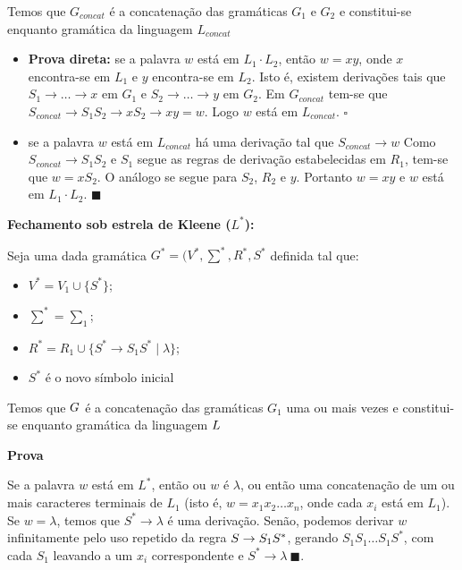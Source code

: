\documentclass[12pt]{article}
\begin{document}
\begin{enumerate}
	      Temos que $G_{concat}$ é a concatenação das gramáticas $G_1$ e $G_2$ e
	      constitui-se enquanto gramática da linguagem $L_{concat}$
	      
	      \begin{itemize}
		      \item \textbf{Prova direta:} se a palavra $w$ está em $L_1 \cdot
			            L_2$, então $w = x y$, onde $x$ encontra-se em $L_1$ e $y$
		            encontra-se em $L_2$. Isto é, existem derivações tais que $S_1
			            \rightarrow \dots \rightarrow x$ em $G_1$ e $S_2
			            \rightarrow \dots \rightarrow y$ em $G_2$. Em $G_{concat}$
		            tem-se que $S_{concat} \rightarrow S_1S_2 \rightarrow xS_2
			            \rightarrow xy = w$. Logo $w$ está em
		            $L_{concat}$. $\square$
		            
		      \item {} se a palavra $w$ está em
		            $L_{concat}$ há uma derivação tal que $S_{concat}
			            \rightarrow w$ Como $S_{concat} \rightarrow S_1S_2$ e
		            $S_1$ segue as regras de derivação estabelecidas em
		            $R_1$, tem-se que $w = xS_2$. O análogo se segue para
		            $S_2$, $R_2$ e $y$. Portanto $w = x y$ e $w$ está em
		            $L_1 \cdot L_2$. $\blacksquare$
	      \end{itemize}
	      
	      \textbf{Fechamento sob estrela de Kleene ($L^*$):}
	      
	      Seja uma dada gramática $G^* = (V^*, \sum^*, R^*, S^*$ definida tal
	      que:
	      
	      \begin{itemize}
		      \item $V^* = V_1 \cup \{S^*\}$;
		      \item $\sum^* = \sum_1$;
		      \item $R^* = R_1 \cup \{S^* \rightarrow S_1S^* \mid \lambda\}$;
		      \item $S^*$ é o novo símbolo inicial
	      \end{itemize}
	      
	      Temos que $G\*$ é a concatenação das gramáticas $G_1$ uma ou mais
	      vezes e constitui-se enquanto gramática da linguagem $L\*$
	      
	      
	      \textbf{Prova}
	      
	      Se a palavra $w$ está em $L^*$, então ou $w$ é $\lambda$, ou então uma
	      concatenação de um ou mais caracteres terminais de $L_1$ (isto é, $w =
		      x_1x_2 \dots x_n$, onde cada $x_i$ está em $L_1$). Se $w = \lambda$,
	      temos que $S^* \rightarrow \lambda$ é uma derivação. Senão,
	      podemos derivar $w$ infinitamente pelo uso repetido da regra $S\*
		      \rightarrow S_1S^*$, gerando $S_1S_1 \dots S_1 S^*$, com
	      cada $S_1$ leavando a um $x_i$ correspondente e $S^*
		      \rightarrow \lambda\ \blacksquare$.
	      

\end{enumerate}
\end{document}
